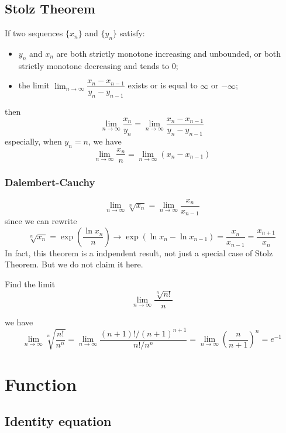 \documentclass{overview}
\begin{document}
\subsection{Stolz Theorem}
If two sequences $\{x_n\}$ and $\{y_n\}$ satisfy:
\begin{itemize}
	\item $y_n$ and $x_n$ are both {strictly monotone increasing} and {unbounded},
		or both {strictly monotone decreasing} and tends to $0$;
	\item the limit $\lim_{n \to \infty} \dfrac{x_n - x_{n-1}}{y_n - y_{n-1}}$ exists or
		is equal to $\infty$ or $-\infty$;
\end{itemize}
then
\[
	\lim_{n \to \infty} \dfrac{x_n}{y_n} = \lim_{n \to \infty} \dfrac{x_n - x_{n-1}}{y_n - y_{n-1}}
\] 
especially, when $y_n = n$, we have
\[
	\lim_{n \to \infty} \dfrac{x_n}{n} = \lim_{n \to \infty} (x_n - x_{n-1})
\] 
\subsubsection{Dalembert-Cauchy}
\[
	\lim_{n \to \infty} \sqrt[n]{x_n} = \lim_{n \to \infty} \dfrac{x_n}{x_{n-1}}
\] 
since we can rewrite
\[
	\sqrt[n]{x_n} = \exp\left(\dfrac{\ln x_n}{n}\right) \to 
	\exp\left(\ln x_n - \ln x_{n-1}\right) = \dfrac{x_n}{x_{n-1}} = \dfrac{x_{n+1}}{x_n}
\]
In fact, this theorem is a indpendent result, not just a special case of Stolz Theorem.
But we do not claim it here.

\begin{example}
	Find the limit
	\[
		\lim_{n \to \infty} \frac{\sqrt[n]{n!}}{n}
	\] 
	\begin{answer}
		we have
		\[
			\lim_{n \to \infty} \sqrt[n]{\frac{n!}{n^{n}}}
		= \lim_{n \to \infty} \dfrac{(n+1)! / (n+1)^{n+1}}{n! / n^{n}}
		= \lim_{n \to \infty} \left(\dfrac{n}{n+1}\right)^{n}
		= e^{-1}
		\]
	\end{answer}
		
\end{example}

\section{Function}

\subsection{Identity equation}
\end{document}
